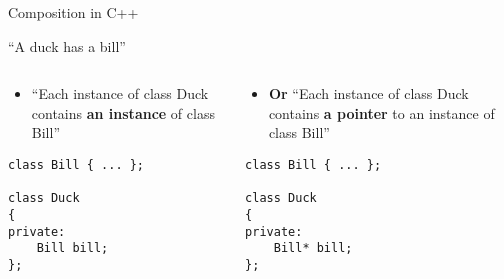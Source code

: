 \begin{frame}[fragile]{Composition in C++}
    \begin{center}
        ``A duck has a bill''
    \end{center}
    \pause
    \begin{columns}
        \begin{column}{0.48\textwidth}
            \begin{itemize}
                \item ``Each instance of class Duck contains \textbf{an instance} of class Bill''
            \end{itemize}
            \begin{lstlisting}
class Bill { ... };

class Duck
{
private:
    Bill bill;
};
            \end{lstlisting}
        \end{column}
        \pause
        \begin{column}{0.48\textwidth}
            \begin{itemize}
                \item \textbf{Or} ``Each instance of class Duck contains \textbf{a pointer} to an instance of class Bill''
            \end{itemize}
            \begin{lstlisting}
class Bill { ... };

class Duck
{
private:
    Bill* bill;
};
            \end{lstlisting}
        \end{column}
    \end{columns}
\end{frame}

